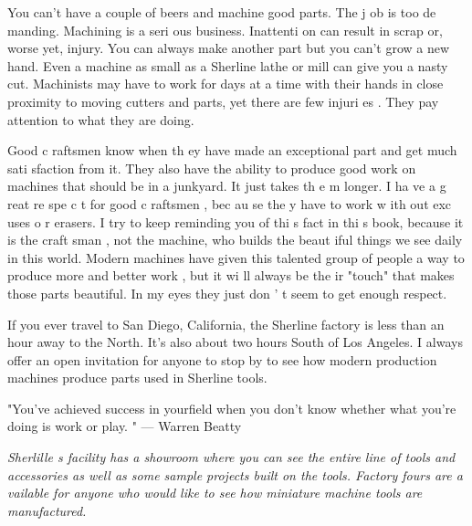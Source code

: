 
You can't have a couple of beers and machine good
parts. The j ob is too de manding. Machining is a
seri ous business. Inattenti on can result in scrap or,
worse yet, injury. You can always make another part
but you can't grow a new hand. Even a machine as
small as a Sherline lathe or mill can give you a nasty
cut. Machinists may have to work for days at a time
with their hands in close proximity to moving cutters
and parts, yet there are few injuri es . They pay
attention to what they are doing.


Good c raftsmen know when th ey have made an exceptional part and get much sati
sfaction from it. They also have the ability to produce good work on machines
that should be in a junkyard. It just takes th e m longer. I ha ve a g reat re
spe c t for good c raftsmen , bec au se the y have to work w ith out exc uses o
r erasers. I try to keep reminding you of thi s fact in thi s book, because it
is the craft sman , not the machine, who builds the beaut iful things we see
daily in this world. Modern machines have given this talented group of people a
way to produce more and better work , but it wi ll always be the ir "touch" that
makes those parts beautiful. In my eyes they just don ' t seem to get enough
respect.


If you ever travel to San Diego, California, the Sherline factory is less than
an hour away to the North. It's also about two hours South of Los Angeles. I
always offer an open invitation for anyone to stop by to see how modern
production machines produce parts used in Sherline tools.

\bigskip
"You've achieved success in yourfield when you don't
know whether what you're doing is work or play. "
\bigskip
--- Warren Beatty
\bigskip

\bigskip\textit{Sherlille s facility has a showroom where you can see the entire
line of tools and accessories as well as some sample projects built on the
tools. Factory fours are a vailable for anyone who would like to see how
miniature machine tools are manufactured.}\bigskip

\secup
\secup
